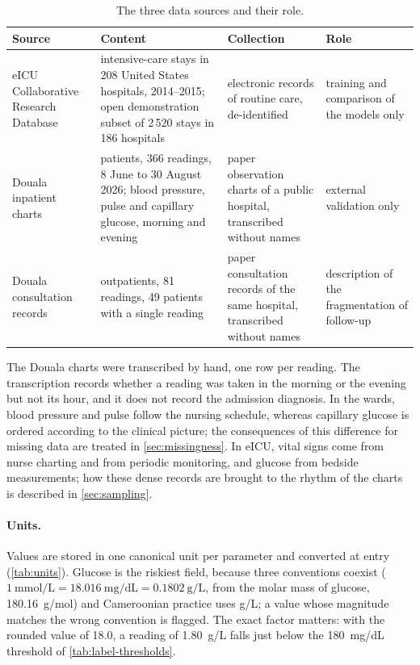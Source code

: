 \begin{table}[htbp]
\centering\footnotesize
\caption{The three data sources and their role.}\label{tab:datasets}
\begin{tabularx}{\textwidth}{@{}>{\raggedright\arraybackslash}p{2.6cm} >{\raggedright\arraybackslash}X >{\raggedright\arraybackslash}p{3.2cm} >{\raggedright\arraybackslash}p{2.7cm}@{}}
\toprule
\textbf{Source} & \textbf{Content} & \textbf{Collection} & \textbf{Role} \\
\midrule
eICU Collaborative Research Database \parencite{pollard2018} & intensive-care stays in 208 United States hospitals, 2014--2015; open demonstration subset of 2\,520 stays in 186 hospitals \parencite{eicudemo} & electronic records of routine care, de-identified & training and comparison of the models only \\
Douala inpatient charts & 32 patients, 366 readings, 8 June to 30 August 2026; blood pressure, pulse and capillary glucose, morning and evening & paper observation charts of a public hospital, transcribed without names & external validation only \\
Douala consultation records & 58 outpatients, 81 readings, 49 patients with a single reading & paper consultation records of the same hospital, transcribed without names & description of the fragmentation of follow-up \\
\bottomrule
\end{tabularx}
\end{table}

The Douala charts were transcribed by hand, one row per reading. The transcription records whether a reading was taken in the morning or the evening but not its hour, and it does not record the admission diagnosis. In the wards, blood pressure and pulse follow the nursing schedule, whereas capillary glucose is ordered according to the clinical picture; the consequences of this difference for missing data are treated in \cref{sec:missingness}. In eICU, vital signs come from nurse charting and from periodic monitoring, and glucose from bedside measurements; how these dense records are brought to the rhythm of the charts is described in \cref{sec:sampling}.

\paragraph{Units.} Values are stored in one canonical unit per parameter and converted at entry (\cref{tab:units}). Glucose is the riskiest field, because three conventions coexist ($1~\text{mmol/L} = 18.016~\text{mg/dL} = 0.1802~\text{g/L}$, from the molar mass of glucose, 180.16~g/mol) and Cameroonian practice uses g/L; a value whose magnitude matches the wrong convention is flagged. The exact factor matters: with the rounded value of 18.0, a reading of 1.80~g/L falls just below the 180~mg/dL threshold of \cref{tab:label-thresholds}.

